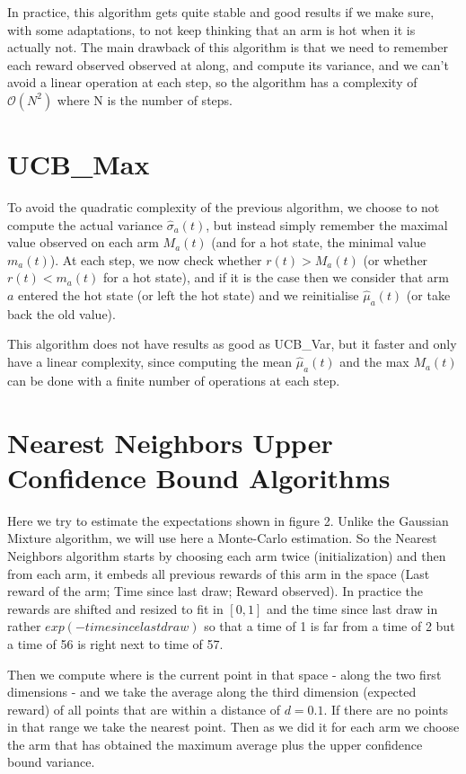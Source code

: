 \documentclass{article} %
\begin{document}
In practice, this algorithm gets quite stable and good results if we make sure,
with some adaptations, to not keep thinking that an arm is hot when it is actually
not. The main drawback of this algorithm is that we need to remember each
reward observed observed at along, and compute its variance, and we can't avoid
a linear operation at each step, so the algorithm has a complexity of $\mathcal{O}(N^2)$ where N
is the number of steps.

\section{UCB\_Max}

To avoid the quadratic complexity of the previous algorithm, we choose to not compute
the actual variance $\hat\sigma_a(t)$, but instead simply remember the maximal value
observed on each arm $M_a(t)$ (and for a hot state, the minimal value $m_a(t)$).
At each step, we now check whether $r(t) > M_a(t)$ (or whether $r(t) < m_a(t)$ for a hot state),
and if it is the case then we consider that arm $a$ entered the hot state (or left the hot state)
and we reinitialise $\hat\mu_a(t)$ (or take back the old value).

This algorithm does not have results as good as UCB\_Var, but it faster and only have
a linear complexity, since computing the mean $\hat\mu_a(t)$ and the max $M_a(t)$
can be done with a finite number of operations at each step. 

\section{Nearest Neighbors Upper Confidence Bound Algorithms}

Here we try to estimate the expectations shown in figure 2. Unlike the Gaussian Mixture algorithm, we will use here a Monte-Carlo estimation. So the Nearest Neighbors algorithm starts by choosing each arm twice (initialization) and then from each arm, it embeds all previous rewards of this arm in the space (Last reward of the arm; Time since last draw; Reward observed). In practice the rewards are shifted and resized to fit in $[0,1]$ and the time since last draw in rather $exp(-time since last draw)$ so that a time of 1 is far from a time of 2 but a time of 56 is right next to time of 57.

Then we compute where is the current point in that space - along the two first dimensions - and we take the average along the third dimension (expected reward) of all points that are within a distance of $d=0.1$. If there are no points in that range we take the nearest point. Then as we did it for each arm we choose the arm that has obtained the maximum average plus the upper confidence bound variance.
\end{document}
